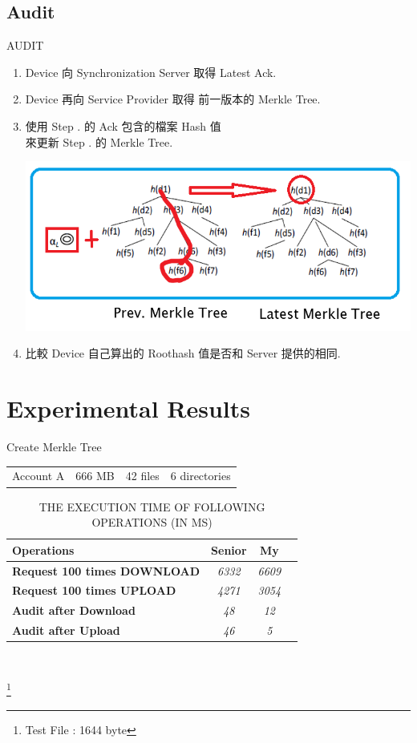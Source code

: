 \documentclass{beamer}
\newcommand{\RNum}[1]{\uppercase\expandafter{\romannumeral #1\relax}}
\begin{document}
\begin{CJK}{UTF8}{bkai}
\subsection{Audit}
\begin{frame}{AUDIT}
	\begin{enumerate}
		\item Device 向 \alert{Synchronization Server} 取得 Latest Ack.
		\item Device 再向 \alert{Service Provider} 取得 前一版本的 Merkle Tree.
		\item 使用 Step \RNum{1}. 的 Ack 包含的檔案 Hash 值\\
			  來更新 Step \RNum{2}. 的 Merkle Tree.
			  \begin{center}
			  \includegraphics[width=.7\textwidth]{auditing.png}
			  \end{center}
		\item 比較 Device 自己算出的 Roothash 值是否和 Server 提供的相同.
	\end{enumerate}
\end{frame}

\section{Experimental Results}
\begin{frame}{Create Merkle Tree}
	\begin{center}
	\begin{tabu}{cccc}
	\rowfont{\color{blue} \scriptsize} {Account A} & {666 MB}  & {42 files}     & {6 directories} \\
	\end{tabu}
	\end{center}
	\begin{table}[]
	\centering
	\captionsetup{justification=centering}
	\caption{\tiny THE EXECUTION TIME OF FOLLOWING OPERATIONS (IN MS)}
	\begin{tabular}{|l|c|c|c|}
	\hline
	{\bf Operations}			  		  & {\bf Senior} & {\bf My}   \\ \hline
	{\bf Request 100 times DOWNLOAD}	  & {\it 6332}   & {\it 6609} \\ \hline
	{\bf Request 100 times UPLOAD}	  & {\it 4271}   & {\it 3054} \\ \hline
	{\bf Audit after Download}		  & {\it 48}     & {\it 12}   \\ \hline
	{\bf Audit after Upload}			  & {\it 46}     & {\it 5}    \\ \hline
	\end{tabular}\\
	\end{table}
	\footnote{Test File : 1644 byte}
\end{frame}


\end{CJK}
\end{document}
